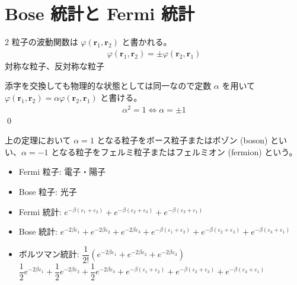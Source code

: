 \documentclass[uplatex,diffipdfmx,a4paper,11pt]{jlreq}
\makeatletter
\newcommand{\rr}{\bm{r}}
\numberwithin{equation}{section}
\theoremstyle{definition}
\renewenvironment{proof}[1][\proofname]{\par
  \normalfont
  \topsep6\p@\@plus6\p@ \trivlist
  \item[\hskip\labelsep{\bfseries #1}\@addpunct{\bfseries}]\ignorespaces\quad\par
}{%
  \qed\endtrivlist\@endpefalse
}
\renewcommand\proofname{証明}
\makeatother
\begin{document}
\section{Bose 統計と Fermi 統計}
\begin{theorem}
  2 粒子の波動関数は $\varphi(\rr_1, \rr_2)$ と書かれる。
  \begin{align}
    \varphi(\rr_1, \rr_2) = \pm \varphi(\rr_2, \rr_1)
  \end{align}
  対称な粒子、反対称な粒子
\end{theorem}
\begin{proof}
  添字を交換しても物理的な状態としては同一なので定数 $\alpha$ を用いて $\varphi(\rr_1, \rr_2) = \alpha\varphi(\rr_2, \rr_1)$ と書ける。
  \begin{align}
    \alpha^2 = 1 \iff \alpha = \pm 1
  \end{align}
\end{proof}

\begin{definition}
  上の定理において $\alpha = 1$ となる粒子をボース粒子またはボゾン (boson) といい、$\alpha = -1$ となる粒子をフェルミ粒子またはフェルミオン (fermion) という。

  \begin{itemize}
    \item Fermi 粒子: 電子・陽子
    \item Bose 粒子: 光子
  \end{itemize}
\end{definition}

\begin{itemize}
  \item Fermi 統計: $e^{-\beta(\varepsilon_1 + \varepsilon_2)} + e^{-\beta(\varepsilon_2 + \varepsilon_3)} + e^{-\beta(\varepsilon_3 + \varepsilon_1)}$
  \item Bose 統計: $e^{-2\beta\varepsilon_1} + e^{-2\beta\varepsilon_2} + e^{-2\beta\varepsilon_3} + e^{-\beta(\varepsilon_1 + \varepsilon_2)} + e^{-\beta(\varepsilon_2 + \varepsilon_3)} + e^{-\beta(\varepsilon_3 + \varepsilon_1)}$
  \item ボルツマン統計: $\dfrac{1}{2!}(e^{-2\beta\varepsilon_1} + e^{-2\beta\varepsilon_2} + e^{-2\beta\varepsilon_3})$ \\
        $\dfrac{1}{2}e^{-2\beta\varepsilon_1} + \dfrac{1}{2}e^{-2\beta\varepsilon_2} + \dfrac{1}{2}e^{-2\beta\varepsilon_3} + e^{-\beta(\varepsilon_1 + \varepsilon_2)} + e^{-\beta(\varepsilon_2 + \varepsilon_3)} + e^{-\beta(\varepsilon_3 + \varepsilon_1)}$
\end{itemize}
\end{document}
